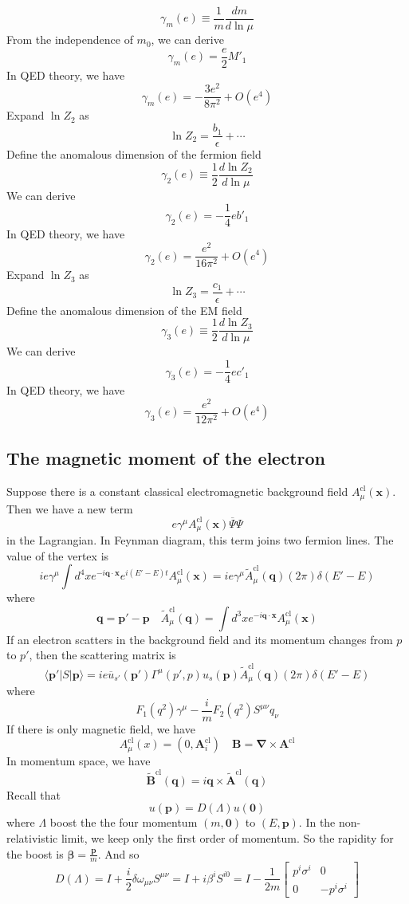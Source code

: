 \documentclass[cyan]{elegantnote}
\begin{document}
\[\gamma_m(e) \equiv \frac{1}{m} \frac{dm}{d \ln \mu}\]
From the independence of $m_0$, we can derive
\[\gamma_m(e) = \frac{e}{2} M'_1\]
In QED theory, we have
\[\gamma_m(e) = -\frac{3e^2}{8\pi^2} + O(e^4)\]
Expand $\ln Z_{2}$ as
\[\ln Z_{2} = \frac{b_1}{\epsilon} + \cdots\]
Define the anomalous dimension of the fermion field
\[\gamma_{2}(e) \equiv \frac{1}{2} \frac{d\ln Z_{2}}{d \ln \mu}\]
We can derive
\[\gamma_{2}(e) = -\frac{1}{4}e b'_1\]
In QED theory, we have
\[\gamma_2(e) = \frac{e^2}{16\pi^2} + O(e^4)\]
Expand $\ln Z_{3}$ as
\[\ln Z_{3} = \frac{c_1}{\epsilon} + \cdots\]
Define the anomalous dimension of the EM field
\[\gamma_{3}(e) \equiv \frac{1}{2} \frac{d\ln Z_{3}}{d \ln \mu}\]
We can derive
\[\gamma_{3}(e) = -\frac{1}{4}e c'_1\]
In QED theory, we have
\[\gamma_3(e) = \frac{e^2}{12\pi^2} + O(e^4)\]

\subsection{The magnetic moment of the electron}
Suppose there is a constant classical electromagnetic background field $A_{\mu}^{\mathrm{cl}}(\bm{x})$. Then we have a new term
\[e\gamma^{\mu}A_{\mu}^{\mathrm{cl}}(\bm{x}) \overline{\Psi}\Psi\]
in the Lagrangian. In Feynman diagram, this term joins two fermion lines. The value of the vertex is
\[ie\gamma^{\mu}\int d^4x e^{-i\bm{q}\cdot\bm{x}}e^{i(E'-E)t} A_{\mu}^{\mathrm{cl}}(\bm{x}) = ie\gamma^{\mu}\tilde{A}_{\mu}^{\mathrm{cl}}(\bm{q})(2\pi)\delta(E'-E)\]
where
\[\bm{q} = \bm{p}' - \bm{p} \quad \tilde{A}_{\mu}^{\mathrm{cl}}(\bm{q}) = \int d^3x e^{-i\bm{q}\cdot\bm{x}} A_{\mu}^{\mathrm{cl}}(\bm{x})\]
If an electron scatters in the background field and its momentum changes from $p$ to $p'$, then the scattering matrix is
\[\langle \bm{p}' | S | \bm{p} \rangle = ie\overline{u}_{s'}(\bm{p}')\Gamma^{\mu}(p',p)u_s(\bm{p})\tilde{A}_{\mu}^{\mathrm{cl}}(\bm{q})(2\pi)\delta(E'-E)\]
where
\[F_1(q^2)\gamma^{\mu} - \frac{i}{m}F_2(q^2)S^{\mu\nu}q_{\nu}\]
If there is only magnetic field, we have
\[A_{\mu}^{\mathrm{cl}}(x) = (0,\bm{A}_{i}^{\mathrm{cl}}) \quad \bm{B} = \bm{\nabla} \times \bm{A}^{\mathrm{cl}}\]
In momentum space, we have
\[\tilde{\bm{B}}^{\mathrm{cl}}(\bm{q}) = i\bm{q}\times\tilde{\bm{A}}^{\mathrm{cl}}(\bm{q})\]
Recall that
\[u(\bm{p}) = D(\Lambda)u(\bm{0})\]
where $\Lambda$ boost the the four momentum $(m,\bm{0})$ to $(E,\bm{p})$.
In the non-relativistic limit, we keep only the first order of momentum. So the rapidity for the boost is $\bm{\beta} = \frac{\bm{p}}{m}$. And so
\[D(\Lambda) = I + \frac{i}{2}\delta\omega_{\mu\nu}S^{\mu\nu} = I + i \beta^i S^{i0} = I - \frac{1}{2m} \begin{bmatrix} p^i \sigma^i  &0\\0& -p^i \sigma^i \end{bmatrix} \]
\end{document}
